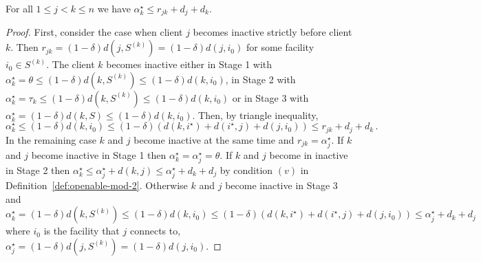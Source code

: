 \begin{lemma}
\label{lem:fr-triangle}
    For all $1 \le j < k \le n$ we have $\alpha^\star_k \le r_{jk} + d_j + d_k$.
\end{lemma}
\begin{proof}
    First, consider the case when client $j$ becomes inactive strictly before client $k$.
    Then $r_{jk} = (1-\delta)d(j,S^{(k)}) = (1-\delta)d(j,i_0)$ for some facility $i_0 \in S^{(k)}$.
     The client $k$ becomes inactive either in Stage 1 with $\alpha_k^\star = \theta \leq (1-\delta) d(k,S^{(k)}) \leq (1-\delta)d(k, i_0)$, in Stage 2 with $\alpha_k^\star = \tau_k \leq (1-\delta)d(k,S^{(k)}) \leq (1-\delta) d(k, i_0)$ or in Stage 3 with $\alpha_k^\star = (1-\delta)d(k,S) \leq (1-\delta) d(k, i_0)$.
    Then, by triangle inequality,
    \[
        \alpha^\star_k \le (1-\delta)d(k,i_0) \le (1-\delta)(d(k, i^\star) + d(i^\star, j) + d(j, i_0)) \le r_{jk} + d_j + d_k\,.
    \]
    In the remaining case $k$ and $j$ become inactive at the same time and $r_{jk} = \alpha^\star_j$.
    If $k$ and $j$ become inactive in Stage 1 then $\alpha^\star_k = \alpha^\star_j = \theta$.
    If $k$ and $j$ become in inactive in Stage 2 then $\alpha^\star_k \le \alpha^\star_j + d(k,j) \le \alpha^\star_j + d_k + d_j$ by condition $(v)$ in Definition~\ref{def:openable-mod-2}.
    Otherwise $k$ and $j$ become inactive in Stage 3 and 
    \[
        \alpha^\star_k = (1-\delta)d(k,S^{(k)}) \le (1-\delta)d(k,i_0) \le (1-\delta)(d(k,i^\star) + d(i^\star,j) + d(j,i_0)) \le \alpha^\star_j + d_k + d_j
    \]
    where $i_0$ is the facility that $j$ connects to, $\alpha^\star_j = (1-\delta)d(j,S^{(k)}) = (1-\delta)d(j,i_0)$. 
\end{proof}

